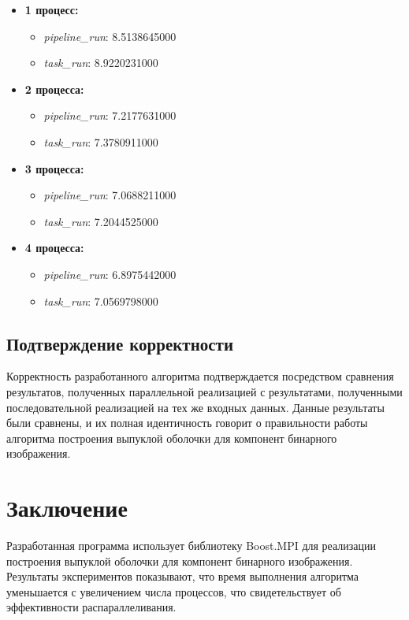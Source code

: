 \documentclass[12pt]{article}
\begin{document}
\begin{itemize}
    \item \textbf{1 процесс:}
        \begin{itemize}
            \item \textit{pipeline\_run}: 8.5138645000
            \item \textit{task\_run}:  8.9220231000
        \end{itemize}
    \item \textbf{2 процесса:}
        \begin{itemize}
            \item \textit{pipeline\_run}: 7.2177631000
            \item \textit{task\_run}: 7.3780911000
        \end{itemize}
     \item \textbf{3 процесса:}
        \begin{itemize}
            \item \textit{pipeline\_run}: 7.0688211000
             \item \textit{task\_run}: 7.2044525000
        \end{itemize}
     \item \textbf{4 процесса:}
        \begin{itemize}
             \item \textit{pipeline\_run}: 6.8975442000
            \item \textit{task\_run}: 7.0569798000
        \end{itemize}
\end{itemize}

\subsection*{Подтверждение корректности}
\label{subsec:correctness_verification}
Корректность разработанного алгоритма подтверждается посредством сравнения результатов, полученных параллельной реализацией с результатами, полученными последовательной реализацией на тех же входных данных. Данные результаты были сравнены, и их полная идентичность говорит о правильности работы алгоритма построения выпуклой оболочки для компонент бинарного изображения.


\section*{Заключение}
Разработанная программа использует библиотеку Boost.MPI для реализации построения выпуклой оболочки для компонент бинарного изображения. Результаты экспериментов показывают, что время выполнения алгоритма уменьшается с увеличением числа процессов, что свидетельствует об эффективности распараллеливания.
\newpage
\end{document}
